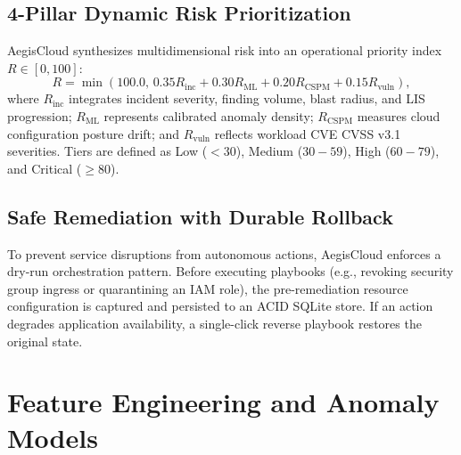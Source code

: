 \documentclass[conference]{IEEEtran}
\begin{document}
\subsection{4-Pillar Dynamic Risk Prioritization}
AegisCloud synthesizes multidimensional risk into an operational priority index $R \in [0, 100]$:
\begin{equation}
R = \min\left(100.0, \, 0.35 R_{\mathrm{inc}} + 0.30 R_{\mathrm{ML}} + 0.20 R_{\mathrm{CSPM}} + 0.15 R_{\mathrm{vuln}}\right),
\label{eq:unified_risk}
\end{equation}
where $R_{\mathrm{inc}}$ integrates incident severity, finding volume, blast radius, and LIS progression; $R_{\mathrm{ML}}$ represents calibrated anomaly density; $R_{\mathrm{CSPM}}$ measures cloud configuration posture drift; and $R_{\mathrm{vuln}}$ reflects workload CVE CVSS v3.1 severities. Tiers are defined as Low ($<30$), Medium ($30-59$), High ($60-79$), and Critical ($\ge 80$).

\subsection{Safe Remediation with Durable Rollback}
To prevent service disruptions from autonomous actions, AegisCloud enforces a dry-run orchestration pattern. Before executing playbooks (e.g., revoking security group ingress or quarantining an IAM role), the pre-remediation resource configuration is captured and persisted to an ACID SQLite store. If an action degrades application availability, a single-click reverse playbook restores the original state.

\section{Feature Engineering and Anomaly Models}
\end{document}
